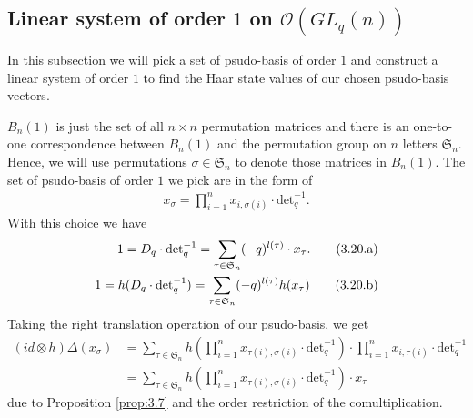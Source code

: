 \documentclass[table,a4paper,reqno]{amsart}
\numberwithin{equation}{section}
\theoremstyle{definition}
\begin{document}
\subsection{Linear system of order $1$ on $\mathcal{O}(GL_q(n))$}
In this subsection we will pick a set of psudo-basis of order $1$ and construct a linear system of order $1$ to find the Haar state values of our chosen psudo-basis vectors.

$B_n(1)$ is just the set of all $n\times n$ permutation matrices and there is an one-to-one correspondence between $B_n(1)$ and the permutation group on $n$ letters $\mathfrak{S}_n$. Hence, we will use permutations $\sigma\in\mathfrak{S}_n$ to denote those matrices in $B_n(1)$. The set of psudo-basis of order $1$ we pick are in the form of
\begin{align}\label{eq:3.19}
    x_\sigma=\prod_{i=1}^nx_{i,\sigma(i)}\cdot\text{det}_q^{-1}.
\end{align}
With this choice we have
\begin{align}\stepcounter{equation}
    1=D_q\cdot\text{det}_q^{-1}=\sum_{\tau\in\mathfrak{S}_n}(-q)^{l(\tau)}\cdot x_{\tau}.\tag{3.20.a}\label{eq:3.20.a}\\
    1=h(D_q\cdot\text{det}_q^{-1})=\sum_{\tau\in\mathfrak{S}_n}(-q)^{l(\tau)}h(x_{\tau})\tag{3.20.b}\label{eq:3.20.b}
\end{align}
Taking the right translation operation of our psudo-basis, we get
\begin{equation}\label{eq:3.21}
\begin{split}
    (id\otimes h)\Delta(x_\sigma)&=\sum_{\tau\in\mathfrak{S}_n}h\left(\prod_{i=1}^nx_{\tau(i),\sigma(i)}\cdot\text{det}_q^{-1}\right)\cdot\prod_{i=1}^nx_{i,\tau(i)}\cdot\text{det}_q^{-1}\\
    &=\sum_{\tau\in\mathfrak{S}_n}h\left(\prod_{i=1}^nx_{\tau(i),\sigma(i)}\cdot\text{det}_q^{-1}\right)\cdot x_{\tau}
\end{split}
\end{equation}
due to Proposition \ref{prop:3.7} and the order restriction of the comultiplication. 
\end{document}
